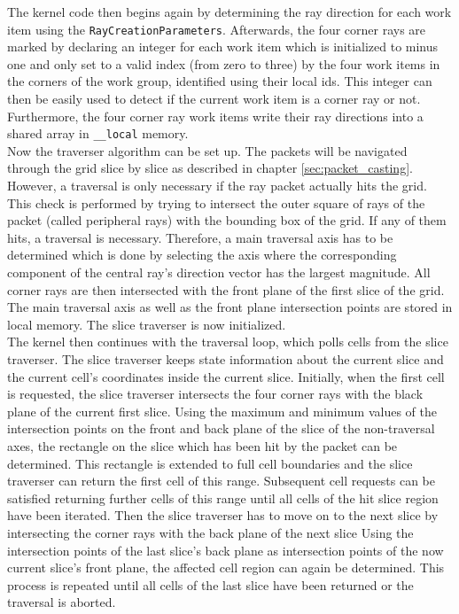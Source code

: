 The kernel code then begins again by determining the ray direction for each work item using the \lstinline!RayCreationParameters!. Afterwards, the four corner rays are marked by declaring an integer for each work item which is initialized to minus one and only set to a valid index (from zero to three) by the four work items in the corners of the work group, identified using their local ids. This integer can then be easily used to detect if the current work item is a corner ray or not. Furthermore, the four corner ray work items write their ray directions into a shared array in \lstinline!__local! memory. \\
Now the traverser algorithm can be set up. The packets will be navigated through the grid slice by slice as described in chapter \ref{sec:packet_casting}. However, a traversal is only necessary if the ray packet actually hits the grid. This check is performed by trying to intersect the outer square of rays of the packet (called peripheral rays) with the bounding box of the grid. If any of them hits, a traversal is necessary. Therefore, a main traversal axis has to be determined which is done by selecting the axis where the corresponding component of the central ray's direction vector has the largest magnitude. All corner rays are then intersected with the front plane of the first slice of the grid. The main traversal axis as well as the front plane intersection points are stored in local memory. The slice traverser is now initialized. \\
The kernel then continues with the traversal loop, which polls cells from the slice traverser. The slice traverser keeps state information about the current slice and the current cell's coordinates inside the current slice. Initially, when the first cell is requested, the slice traverser intersects the four corner rays with the black plane of the current first slice. Using the maximum and minimum values of the intersection points on the front and back plane of the slice of the non-traversal axes, the rectangle on the slice which has been hit by the packet can be determined. This rectangle is extended to full cell boundaries and the slice traverser can return the first cell of this range. Subsequent cell requests can be satisfied returning further cells of this range until all cells of the hit slice region have been iterated. Then the slice traverser has to move on to the next slice by intersecting the corner rays with the back plane of the next slice Using the intersection points of the last slice's back plane as intersection points of the now current slice's front plane, the affected cell region can again be determined. This process is repeated until all cells of the last slice have been returned or the traversal is aborted. \\
